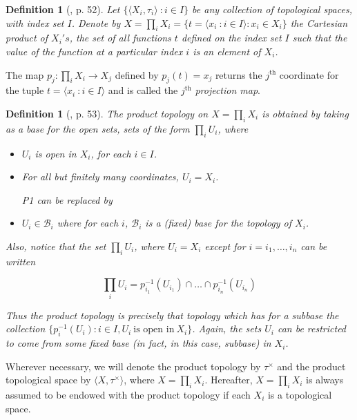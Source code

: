 \documentclass[12pt, oneside]{book}
\newtheorem{definition}[theorem]{Definition}
\begin{document}
\begin{definition} [\cite{W2}, p. 52] 
\normalfont
Let $\{ {\langle X_i , \tau_i \rangle\ : i \in I} \}$ be any collection of topological spaces, 
with index set $I$. 
Denote by $X = \prod_i  X_i = \{ t = \langle x_i\ : i \in I  \rangle : x_i \in X_i\}$ the 
{\sl Cartesian product} of $X_i's$, the set of all functions $t$ defined on the index 
set $I$ such that the value of the function at a particular index $i$ is an element of $X_i$.

\end{definition}

\noindent The map $p_j : \prod_i X_i \to  X_j$ defined by $p_j(t)=x_j$ returns the 
$j^{\text{th}}$ coordinate for the tuple $t= \langle x_i\ : i \in I \rangle$ and is called 
the $j^{\text{th}}$ {\sl projection map}.

\begin{definition}[\cite{W2}, p. 53] 
\normalfont
The {\sl product topology} on $X=\prod_i X_i$ is obtained by taking as a base for the open sets, sets of the form $\prod_i U_i$, where

\begin{itemize}

\item [P1.] \quad $U_i$ is open in $X_i$, for each $i \in I$.

\item [P2.] \quad  For all but finitely many coordinates, $U_i=X_i$.

P1 can be replaced by

\item [P$1'$.] \quad  $U_i \in \mathscr{B}_i$ where for each $i$, $\mathscr{B}_i$ is a (fixed) base for the topology of $X_i$.
\end{itemize}
\vskip 0.3cm
\noindent Also, notice that the set $\prod_i U_i$, where $U_i=X_i$ except for $i=i_1, \dots, i_n$ can be written

$$ \prod_i U_i = p_{i_1}^{-1}(U_{i_1}) \cap \dots \cap p_{i_n}^{-1}(U_{i_n})$$

\noindent Thus the product topology is precisely that topology which has for a subbase the
 collection $\{ p_i^{-1}(U_i): i \in I, U_i\ \text{is open in}\ X_i \}$. Again, the sets $U_i$ 
can be restricted to come from some fixed base (in fact, in this case, subbase) in $X_i$.

\end{definition}

\noindent Wherever necessary, we will denote the product topology by $\tau^{\times}$ and the product topological space by $\langle X, \tau^{\times} \rangle$, where $X=\prod_i X_i$. 
Hereafter, $X=\prod_i X_i$ is always assumed to be endowed with the product topology if each $X_i$ is a topological space.
\end{document}
